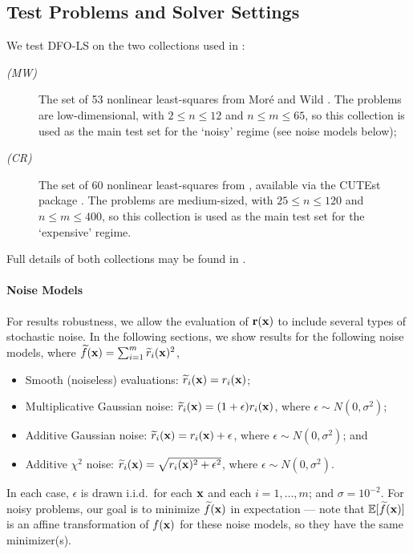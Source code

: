 \subsection{Test Problems and Solver Settings} \label{sec_test_problems}
We test DFO-LS on the two collections used in \cite{Cartis2017a}:
\begin{description}
	\item[\rm \textit{(MW)}] The set of 53 nonlinear least-squares from Mor\'e and Wild \cite{More2009}. The problems are low-dimensional, with $2 \leq n \leq 12$ and $n \leq m \leq 65$, so this collection is used as the main test set for the `noisy' regime (see noise models below);
	\item[\rm \textit{(CR)}] The set of 60 nonlinear least-squares from \cite{Cartis2017a}, available via the CUTEst package \cite{Gould2015}. The problems are medium-sized, with $25 \leq n \leq 120$ and $n\leq m \leq 400$, so this collection is used as the main test set for the `expensive' regime.
\end{description}
Full details of both collections may be found in \cite{Cartis2017a}.

\paragraph{Noise Models}
For results robustness, we allow the evaluation of $\mathbf{r}(\mathbf{x})$ to include several types of stochastic noise.
In the following sections, we show results for the following noise models, where $\widetilde{f}(\mathbf{x})=\sum_{i=1}^m \widetilde{r}_i(\mathbf{x})^2$, 
\begin{itemize}
	\item Smooth (noiseless) evaluations: $\widetilde{r}_i(\mathbf{x}) = r_i(\mathbf{x})$;
	\item Multiplicative Gaussian noise: $\widetilde{r}_i(\mathbf{x}) = (1+\epsilon)r_i(\mathbf{x})$, where $\epsilon\sim N(0,\sigma^2)$;
	\item Additive Gaussian noise: $\widetilde{r}_i(\mathbf{x}) = r_i(\mathbf{x}) + \epsilon$, where $\epsilon\sim N(0,\sigma^2)$; and
	\item Additive $\chi^2$ noise: $\widetilde{r}_i(\mathbf{x}) = \sqrt{r_i(\mathbf{x})^2 + \epsilon^2}$, where $\epsilon\sim N(0,\sigma^2)$.
\end{itemize}
In each case, $\epsilon$ is drawn i.i.d.~for each $\mathbf{x}$ and each $i=1,\ldots,m$; and  $\sigma=10^{-2}$.
For noisy problems, our goal is to minimize $\widetilde{f}(\mathbf{x})$ in expectation --- note that $\mathbb{E}[\widetilde{f}(\mathbf{x})]$ is an affine transformation of $f(\mathbf{x})$ for these noise models, so they have the same minimizer(s).

